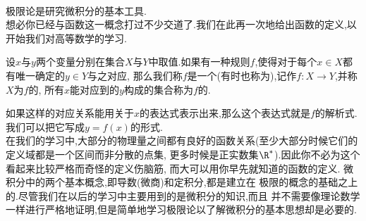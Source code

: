 \documentclass{ctexart}
\begin{document}
\pagestyle{plain}
\noindent{}\vspace{15pt}\\
\indent 极限论是研究微积分的基本工具.\vspace{12pt}\\
\indent 想必你已经与函数这一概念打过不少交道了.我们在此再一次地给出函数的定义,以开始我们对高等数学的学习.
\begin{definition}[0A.1.1 函数]
    设$x$与$y$两个变量分别在集合$X$与$Y$中取值.如果有一种规则$f$,使得对于每个$x\in X$都有唯一确定的$y\in Y$与之对应,%
    那么我们称$f$是一个(有时也称为),记作$f:X\to Y$,并称$X$为$f$的,%
    所有$x$能对应到的$y$构成的集合称为$f$的.
\end{definition}
如果这样的对应关系能用关于$x$的表达式表示出来,那么这个表达式就是$f$的解析式.%
我们可以把它写成$y=f(x)$的形式.\\
\indent 在我们的学习中,大部分的物理量之间都有良好的函数关系(至少大部分时候它们的定义域都是一个区间而非分散的点集,%
更多时候是正实数集$\R^*$).因此你不必为这个看起来比较严格而奇怪的定义伤脑筋,%
而大可以用你早先就知道的函数的定义.
\indent 微积分中的两个基本概念,即导数(微商)和定积分,都是建立在%
极限的概念的基础之上的.尽管我们在以后的学习中主要用到的是微积分的知识,而且%
并不需要像理论数学一样进行严格地证明,但是简单地学习极限论以了解微积分的基本思想却是必要的.
\end{document}
